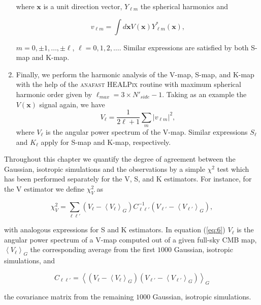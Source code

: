 \begin{enumerate}
\noindent where $\mathbf{x}$ is a unit direction vector, $Y_{\ell m}$ the spherical harmonics and 

\begin{equation}
v_{\ell m} = \int d\mathbf{x} V(\mathbf{x}) Y^*_{\ell m}(\mathbf{x}),
\end{equation}

\noindent $m=0,\pm1,\dots,\pm \ell$, $\ell=0,1,2,\dots$. Similar expressions are satisfied by both S-map and K-map. 

\item Finally, we perform the harmonic analysis of the V-map, S-map, and K-map with the help of the \textsc{anafast HEALPix} routine with maximum spherical harmonic order given by $\ell_{max}=3\times N'_{side}-1$. Taking as an example the $V(\mathbf{x})$ signal again, we have 
\begin{equation}
\label{eq:5}
V_\ell = \frac{1}{2 \ell +1} \sum_{m} |v_{\ell m}|^2 ,
\end{equation}
where $V_{\ell}$ is the angular power spectrum of the V-map. Similar expressions  $S_\ell$ and $K_\ell$ apply for S-map and K-map, respectively.
\end{enumerate}

Throughout this chapter we quantify the degree of agreement between the Gaussian, isotropic simulations and the observations by a simple $\chi^2$ test which has been performed separately for the V, S, and K estimators. For instance, for the V estimator we define $\chi^2_{V}$ as 

\begin{equation}
\chi^2_{V} = \sum_{\ell \ell'} \left( V_\ell - \left\langle V_\ell \right\rangle_G \right) C^{-1}_{\ell \ell'} \left( V_{\ell'} - \left\langle V_{\ell'} \right\rangle_G\right),
\label{eq:6}
\end{equation}

with analogous expressions for S and K estimators. In equation (\ref{eq:6}) $V_\ell$ is the angular power spectrum of a V-map computed out of a given full-sky CMB map, $\left\langle V_\ell \right\rangle_G$ the corresponding average from the first $1000$ Gaussian, isotropic simulations, and 

\begin{equation}
C_{\ell \ell'} = \left\langle \left( V_\ell - \left\langle V_\ell \right\rangle_G \right) \left( V_{\ell'} - \left\langle V_{\ell'} \right\rangle_G \right)\right\rangle_G
\end{equation}

the covariance matrix from the remaining $1000$  Gaussian, isotropic simulations.

